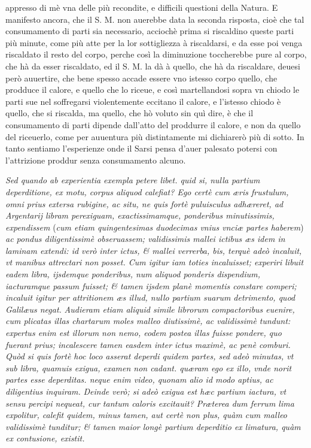 \documentclass[11pt,twoside,openany]{book}
\begin{document}
appresso di mè vna delle più recondite, e difficili questioni della Natura. E manifesto ancora, che il S. M. non auerebbe data la seconda risposta, cioè che tal consumamento di parti sia necessario, acciochè prima si riscaldino queste parti più minute, come più atte per la lor sottigliezza à riscaldarsi, e da esse poi venga riscaldato il resto del corpo, perche così la diminuzione toccherebbe pure al corpo, che hà da esser riscaldato, ed il S. M. la dà à quello, che hà da riscaldare, deuesi però auuertire, che bene spesso accade essere vno istesso corpo quello, che prodduce il calore, e quello che lo riceue, e così martellandosi sopra vn chiodo le parti sue nel soffregarsi violentemente eccitano il calore, e l'istesso chiodo è quello, che si riscalda, ma quello, che hò voluto sin quì dire, è che il consumamento di parti dipende dall'atto del proddurre il calore, e non da quello del riceuerlo, come per auuentura più distintamente mi dichiarerò più di sotto. In tanto sentiamo l'esperienze onde il Sarsi pensa d'auer palesato potersi con l'attrizione proddur senza consumamento alcuno.



\par\bigskip\noindent{}\enspace \textit{Sed quando ab experientia exempla petere libet. quid si, nulla partium deperditione, ex motu, corpus aliquod calefiat? Ego certè cum æris frustulum, omni prius extersa rubigine, ac situ, ne quis fortè puluisculus adhæreret, ad Argentarij libram perexiguam, exactissimamque, ponderibus minutissimis, expendissem }(\textit{cum etiam quingentesimas duodecimas vnius vnciæ partes haberem})\textit{ ac pondus diligentissimè obseruassem; validissimis mallei ictibus æs idem in laminam extendi: id verò inter ictus, \& mallei verrerba, bis, terquè adeò incaluit, vt manibus attrectari non posset. Cum igitur iam toties incaluisset; experiri libuit }\textit{eadem libra, ijsdemque ponderibus, num aliquod ponderis dispendium, iacturamque passum fuisset; \& tamen ijsdem planè momentis constare comperi; incaluit igitur per attritionem æs illud, nullo partium suarum detrimento, quod Galilæus negat.}\textsc{ }\textit{Audieram etiam aliquid simile librorum compactoribus euenire, cum plicatas illas chartarum moles malleo diutissimè, ac validissimè tundunt: expertus enim est illorum non nemo, eodem postea illas fuisse pondere, quo fuerant prius; incalescere tamen easdem inter ictus maximè, ac penè comburi. Quòd si quis fortè hoc loco asserat deperdi quidem partes, sed adeò minutas, vt sub libra, quamuis exigua, examen non cadant. quæram ego ex illo, vnde norit partes esse deperditas. neque enim video, quonam alio id modo aptius, ac diligentius inquiram.}\textit{ }\textit{Deinde verò; si adeò exigua est hæc partium iactura, vt sensu percipi nequeat, cur tantum caloris excitauit? Præterea dum ferrum lima expolitur, calefit quidem, minus tamen, aut certè non plus, quàm cum malleo validissimè tunditur; \& tamen maior longè partium deperditio ex limatura, quàm ex contusione, existit.}
\end{document}
